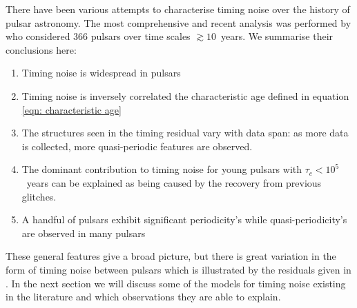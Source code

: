 There have been various attempts to characterise timing noise over the history
of pulsar astronomy. The most comprehensive and recent analysis was performed by
\citet{Hobbs2010} who considered 366 pulsars over time scales $\gtrsim10$~years.
We summarise their conclusions here:
\begin{enumerate}

    \item Timing noise is widespread in pulsars

    \item Timing noise is inversely correlated the characteristic age
        defined in equation \ref{eqn: characteristic age}

    \item The structures seen in the timing residual vary with data span: as
        more data is collected, more quasi-periodic features are observed.

    \item The dominant contribution to timing noise for young pulsars with
        $\tau_{c}<10^{5}$~years can be explained as being caused by the
        recovery from previous glitches.

    \item A handful of pulsars exhibit significant periodicity's while
        quasi-periodicity's are observed in many pulsars

\end{enumerate}

These general features give a broad picture, but there is great variation in
the form of timing noise between pulsars which is illustrated by the residuals
given in \citet{Hobbs2010}. In the next section we will discuss some of the
models for timing noise existing in the literature and which observations they
are able to explain.
